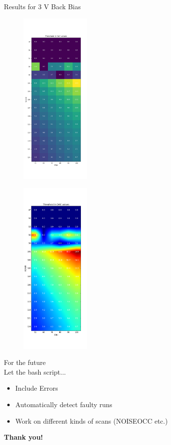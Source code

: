 \begin{frame}{Results for 3 V Back Bias}
    \begin{minipage}{.49\textwidth}
    \begin{figure}[H]
	\centering
	\includegraphics[width=3.5cm]{bb3_Heatmap.png}
    \end{figure}
    \end{minipage}
    \begin{minipage}{.49\textwidth}
    \begin{figure}[H]
	\centering
	\includegraphics[width=3.5cm]{bb3_Heatmap_soft.png}
    \end{figure}
    \end{minipage}
\end{frame}

\begin{frame}
    \Large For the future \\[.5cm]
    \normalsize Let the bash script...
    \begin{itemize}
	\item Include Errors
	    \pause
	\item Automatically detect faulty runs
	    \pause
	\item Work on different kinds of scans (NOISEOCC etc.)\\[1cm]
    \end{itemize}
    \pause
    \centering \huge \color{blue!30!black} \textbf{Thank you!}
\end{frame}
